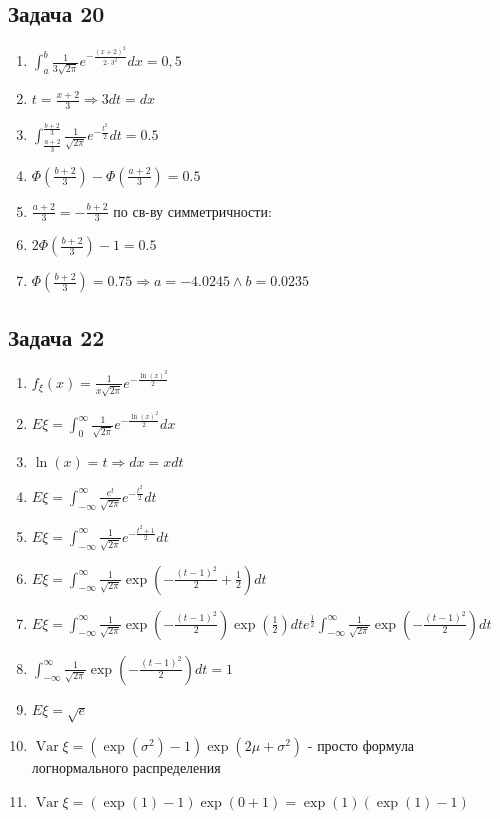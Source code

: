 \documentclass[a4paper,12pt]{article}
\begin{document}
\subsection{Задача 20}
\begin{enumerate}
    \item $ \int_{a}^{b} \frac{1}{3\sqrt{2\pi}} e^{-\frac{(x+2)^2}{2\cdot 3^2}} dx = 0,5 $
    \item $t = \frac{x+2}{3} \Rightarrow 3dt = dx$
    \item $\int_{\frac{a+2}{3}}^{\frac{b+2}{3}} \frac{1}{\sqrt{2\pi}}e^{-\frac{t^2}{2}}dt = 0.5$
    \item $\Phi(\frac{b+2}{3})-\Phi(\frac{a+2}{3}) = 0.5$
    \item $\frac{a+2}{3} = -\frac{b+2}{3}$ по св-ву симметричности:
    \item $2\Phi(\frac{b+2}{3})-1=0.5$
    \item $\Phi(\frac{b+2}{3}) = 0.75 \Rightarrow a=-4.0245 \land b = 0.0235$
\end{enumerate}

\subsection{Задача 22}
\begin{enumerate}
    \item $f_\xi (x) = \frac{1}{x\sqrt{2\pi}}e^{-\frac{\ln(x)^2}{2}}$
    \item $E\xi = \int_{0}^{\infty} \frac{1}{\sqrt{2\pi}}e^{-\frac{\ln(x)^2}{2}} dx$
    \item $\ln(x) = t \Rightarrow dx = xdt$
    \item $E\xi = \int_{-\infty}^{\infty} \frac{e^t}{\sqrt{2\pi}}e^{-\frac{t^2}{2}}dt$
    \item $E\xi = \int_{-\infty}^{\infty} \frac{1}{\sqrt{2\pi}}e^{-\frac{t^2+1}{2}}dt$
    \item $E\xi = \int_{-\infty}^{\infty} \frac{1}{\sqrt{2\pi}} \exp\left( -\frac{(t - 1)^2}{2} + \frac{1}{2} \right) dt$
    \item $E\xi = \int_{-\infty}^{\infty} \frac{1}{\sqrt{2\pi}} \exp\left(-\frac{(t - 1)^2}{2}\right) \exp\left(\frac{1}{2}\right) dt  e^{\frac{1}{2}} \int_{-\infty}^{\infty} \frac{1}{\sqrt{2\pi}} \exp\left(-\frac{(t - 1)^2}{2}\right) dt$
    \item $\int_{-\infty}^{\infty} \frac{1}{\sqrt{2\pi}} \exp\left(-\frac{(t - 1)^2}{2}\right) dt = 1$
    \item $E\xi = \sqrt{e}$
    \item $\operatorname{Var} \xi = \left(\exp(\sigma^2) - 1\right) \exp\left(2\mu + \sigma^2\right)$ - просто формула логнормального распределения
    \item $\operatorname{Var} \xi = \left(\exp(1) - 1\right) \exp\left(0 + 1\right) = \exp(1)\left(\exp(1) - 1\right)$
\end{enumerate}
\end{document}
